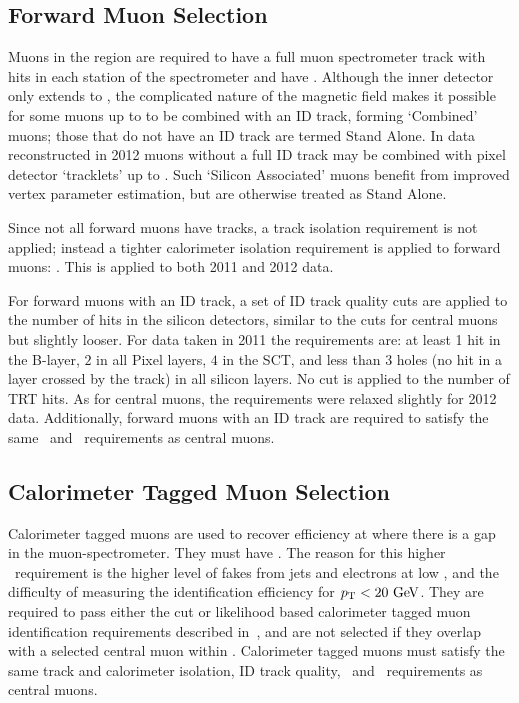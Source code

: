 \subsection{Forward Muon Selection}

Muons in the region  are required to have a full muon
spectrometer track with hits in each station of the spectrometer and have
. Although the
inner detector only extends to , the complicated nature of the
magnetic field makes it possible for some muons up to  to be
combined with an ID track, forming `Combined' muons; those that do not have an
ID track are termed Stand Alone.  In data reconstructed in 2012 muons without a
full ID track may be combined with pixel detector `tracklets' up to
. Such `Silicon Associated' muons benefit from improved vertex
parameter estimation, but are otherwise treated as Stand Alone. 

Since not all forward muons
have tracks, a track isolation requirement is not applied; instead a tighter calorimeter isolation
requirement is applied to forward muons: . This is applied
to both 2011 and 2012 data.

For forward muons with an ID track, a set of ID track quality
cuts are applied to the number of hits in the silicon detectors, similar to the
cuts for central muons but slightly looser. For data taken in 2011
the requirements are: at least 1 hit in the B-layer, $2$ in all Pixel layers,
$4$ in the SCT, and less than 3 holes (no hit in a layer crossed by the track)
in all silicon layers. No cut is applied to the number of TRT hits. As for
central muons, the requirements were relaxed slightly for 2012 data.
Additionally, forward muons with an ID track are required to satisfy the same
\zzero\ and \dzerosig\ requirements as central muons.

\subsection{Calorimeter Tagged Muon Selection}

Calorimeter tagged muons are used to recover efficiency at  where
there is a gap in the muon-spectrometer. They must have . The reason
for this higher \pt\ requirement is the higher level of fakes from jets and
electrons at low \pt, and the difficulty of measuring the identification
efficiency for $\pt<20\gev$. They are required to pass either the cut or
likelihood based calorimeter tagged muon identification requirements described
in~, and are not selected if they overlap with a selected
central muon within . Calorimeter tagged muons must satisfy the
same track and calorimeter isolation, ID track quality, \zzero\ and \dzerosig\
requirements as central muons.

